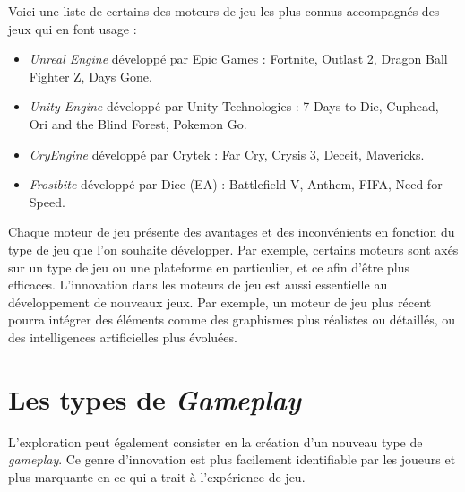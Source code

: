 Voici une liste de certains des moteurs de jeu les plus connus accompagnés des jeux qui en font usage : 
\begin{itemize}
    \item \emph{Unreal Engine} \cite{UnrealEngine} développé par Epic Games : Fortnite, Outlast 2, Dragon Ball Fighter Z, Days Gone.
    \item \emph{Unity Engine} \cite{UnityEngine} développé par Unity Technologies : 7 Days to Die, Cuphead, Ori and the Blind Forest, Pokemon Go.
    \item \emph{CryEngine} \cite{CryEngine} développé par Crytek : Far Cry, Crysis 3, Deceit, Mavericks.
    \item \emph{Frostbite} \cite{FrostbiteEngine} développé par Dice (EA) : Battlefield V, Anthem, FIFA, Need for Speed.
\end{itemize}

Chaque moteur de jeu présente des avantages et des inconvénients en fonction du type de jeu que l'on souhaite développer.
Par exemple, certains moteurs sont axés sur un type de jeu ou une plateforme en particulier, et ce afin d'être plus efficaces. 
L'innovation dans les moteurs de jeu est aussi essentielle au développement de nouveaux jeux. 
Par exemple, un moteur de jeu plus récent pourra intégrer des éléments comme des graphismes plus réalistes ou détaillés, ou des intelligences artificielles plus évoluées.

\section{Les types de \emph{Gameplay}}
L'exploration peut également consister en la création d'un nouveau type de \emph{gameplay}.
Ce genre d'innovation est plus facilement identifiable par les joueurs et plus marquante en ce qui a trait \`a l'expérience de jeu. 



